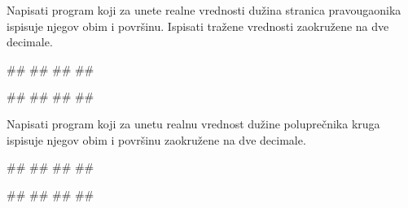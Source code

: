 \begin{Exercise}[label=UZ_NI_21] 
Napisati program koji za unete realne vrednosti dužina stranica pravougaonika ispisuje 
njegov obim i površinu. Ispisati tražene vrednosti zaokružene na dve decimale.

\begin{miditest}
\begin{upotreba}{1}
#\naslovInt#
##
##
##
\end{upotreba}
\end{miditest}
\begin{miditest}
\begin{upotreba}{2}
#\naslovInt#
##
##
##
\end{upotreba}
\end{miditest}

\end{Exercise}
\ifresenja
\begin{Answer}[ref=UZ_NI_21]
\end{Answer}
\fi


\begin{Exercise}[label=UZ_NI_22] 
Napisati program koji za unetu realnu vrednost dužine poluprečnika kruga ispisuje njegov obim i površinu zaokružene na dve decimale. 
      
\begin{miditest}
\begin{upotreba}{1}
#\naslovInt#
##
##
##
\end{upotreba}
\end{miditest}
\begin{miditest}
\begin{upotreba}{2}
#\naslovInt#
##
##
##
\end{upotreba}
\end{miditest}   
   
\end{Exercise}
\ifresenja
\begin{Answer}[ref=UZ_NI_22]
\end{Answer}
\fi


